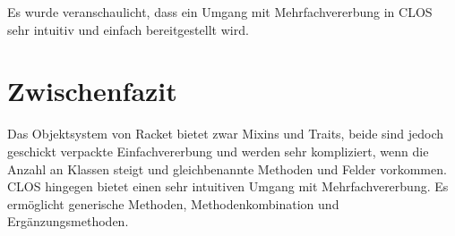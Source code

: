 % 
% 
% 
% 
% 
% 
% 

Es wurde veranschaulicht, dass ein Umgang mit Mehrfachvererbung in CLOS sehr intuitiv und einfach bereitgestellt wird.

\section{Zwischenfazit}
Das Objektsystem von Racket bietet zwar Mixins und Traits, beide sind jedoch geschickt verpackte Einfachvererbung und werden sehr kompliziert, wenn die Anzahl an Klassen steigt und gleichbenannte Methoden und Felder vorkommen. CLOS hingegen bietet einen sehr intuitiven Umgang mit Mehrfachvererbung. Es ermöglicht generische Methoden, Methodenkombination und Ergänzungsmethoden.